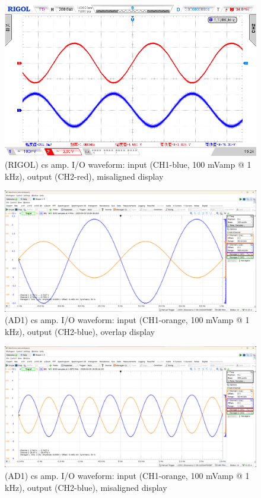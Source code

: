 \documentclass[UTF8]{article}
\begin{document}
\begin{figure}[H]\centering
    \includegraphics[width=\columnwidth]{LCE-04-场效应管/assets/cs amp/CS 输入输出波形 RIGOL (2).png}
    \caption{(RIGOL) cs amp. I/O waveform: input (CH1-blue, 100 mVamp @ 1 kHz), output (CH2-red), misaligned display}
\end{figure}

\begin{figure}[H]\centering
    \includegraphics[width=\columnwidth]{LCE-04-场效应管/assets/cs amp/CS 输入输出波形.png}
    \caption{(AD1) cs amp. I/O waveform: input (CH1-orange, 100 mVamp @ 1 kHz), output (CH2-blue), overlap display}
\end{figure}

\begin{figure}[H]\centering
    \includegraphics[width=\columnwidth]{LCE-04-场效应管/assets/cs amp/CS 输入输出波形 (2).png}
    \caption{(AD1) cs amp. I/O waveform: input (CH1-orange, 100 mVamp @ 1 kHz), output (CH2-blue), misaligned display}
\end{figure}
\end{document}
